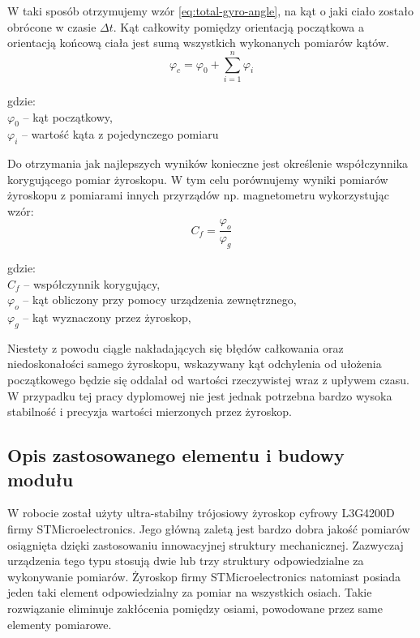 W taki sposób otrzymujemy wzór \ref{eq:total-gyro-angle}, na kąt o jaki ciało
zostało obrócone w czasie $\Delta t$. Kąt całkowity pomiędzy orientacją początkowa a orientacją
końcową ciała jest sumą wszystkich wykonanych pomiarów kątów.
\begin{equation}
  \label{eq:total-gyro-angle}
  \varphi_{c} = \varphi_{0} + \sum_{i=1}^{n} \varphi_{i} 
\end{equation}
\begin{tabbing}
  gdzie: \= \\
    \> $\varphi_{0}$ -- kąt początkowy,\\
    \> $\varphi_{i}$ -- wartość kąta z pojedynczego pomiaru\\
\end{tabbing}
Do otrzymania jak najlepszych wyników konieczne jest określenie współczynnika korygującego pomiar żyroskopu.
W tym celu porównujemy wyniki pomiarów żyroskopu z pomiarami innych przyrządów np. magnetometru wykorzystując wzór:
\begin{equation}
  C_{f} = \frac{\varphi_{o}}{\varphi_{g}}
\end{equation}
\begin{tabbing}
  gdzie: \= \\
    \> $C_{f}$ -- współczynnik korygujący, \\
    \> $\varphi_{o}$ -- kąt obliczony przy pomocy urządzenia zewnętrznego,\\
    \> $\varphi_{g}$ -- kąt wyznaczony przez żyroskop,\\
\end{tabbing}

Niestety z powodu ciągle nakładających się błędów całkowania oraz niedoskonałości samego żyroskopu, wskazywany kąt odchylenia od ułożenia początkowego będzie się oddalał od wartości rzeczywistej wraz z upływem czasu. W przypadku tej pracy dyplomowej nie jest jednak potrzebna bardzo wysoka stabilność i precyzja wartości mierzonych przez żyroskop.

\subsection{Opis zastosowanego elementu i budowy modułu}
W robocie został użyty ultra-stabilny trójosiowy żyroskop cyfrowy L3G4200D firmy STMicroelectronics. Jego główną zaletą jest bardzo dobra jakość pomiarów osiągnięta dzięki zastosowaniu innowacyjnej struktury mechanicznej. Zazwyczaj urządzenia tego typu stosują dwie lub trzy struktury odpowiedzialne za wykonywanie pomiarów. Żyroskop firmy STMicroelectronics natomiast posiada jeden taki element odpowiedzialny za pomiar na wszystkich osiach. Takie rozwiązanie eliminuje zakłócenia pomiędzy osiami, powodowane przez same elementy pomiarowe.
\\

